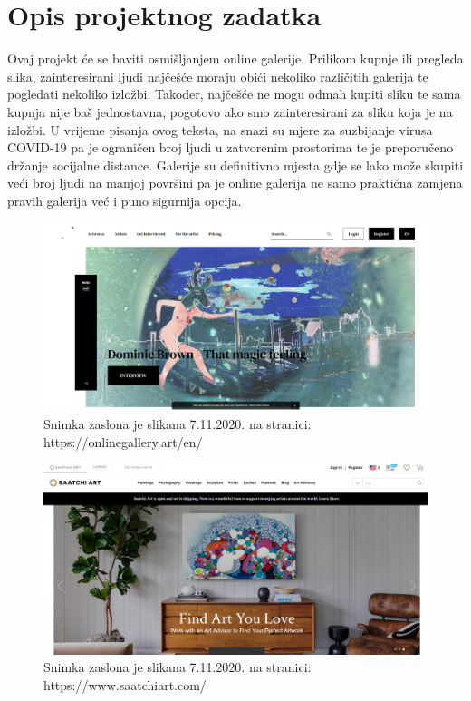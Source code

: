 \chapter{Opis projektnog zadatka}
		
		{Ovaj projekt će se baviti osmišljanjem online galerije. Prilikom kupnje ili pregleda slika, zainteresirani ljudi najčešće moraju obići nekoliko različitih galerija te pogledati nekoliko  izložbi. Također, najčešće ne mogu odmah kupiti sliku te sama kupnja nije baš jednostavna, pogotovo ako smo zainteresirani za sliku koja je na izložbi. 
		U vrijeme pisanja ovog  teksta, na snazi su mjere za suzbijanje virusa COVID-19 pa je ograničen broj ljudi u zatvorenim prostorima te je preporučeno držanje socijalne distance. Galerije su definitivno mjesta gdje se lako može skupiti veći broj ljudi na manjoj površini pa je online galerija ne samo praktična zamjena pravih galerija već i puno sigurnija opcija. 	
		\vspace{10mm} 
}
		\graphicspath{ {./slike/} }
				\begin{figure}[H]

					\includegraphics[width=\textwidth,height=\textheight,keepaspectratio]{onlinegallery_art}
					\caption{Snimka zaslona je slikana 7.11.2020. na  stranici: \newline https://onlinegallery.art/en/ }

				\end{figure}
		\graphicspath{ {./slike/} }
				\begin{figure}[H]

					\includegraphics[width=\textwidth,height=\textheight,keepaspectratio]{saatchiart_com}
					\caption{Snimka zaslona je slikana 7.11.2020. na  stranici: \newline https://www.saatchiart.com/}

				\end{figure}	
		
